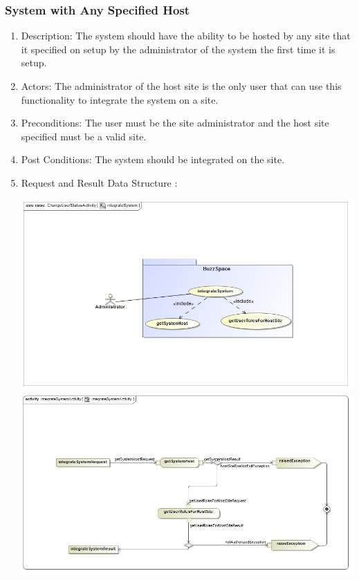\documentclass[12pt, oneside]{article}
\begin{document}
\subsubsection{System with Any Specified Host}
\begin{enumerate}
\item Description: The system should have the ability to be hosted by any site that it specified on setup by the administrator of the system the first time it is setup.
\item Actors: The administrator of the host site is the only user that can use this functionality to integrate the system on a site.
\item Preconditions: The user must be the site administrator and the host site specified must be a valid site.
\item Post Conditions: The system should be integrated on the site.
\item Request and Result Data Structure : 
\begin{center}
\includegraphics[scale=0.5]{integrateSystem.jpg}
\includegraphics[scale=0.5]{integrateSystemActivity.jpg}
\end{center}
\end{enumerate}
\end{document}
